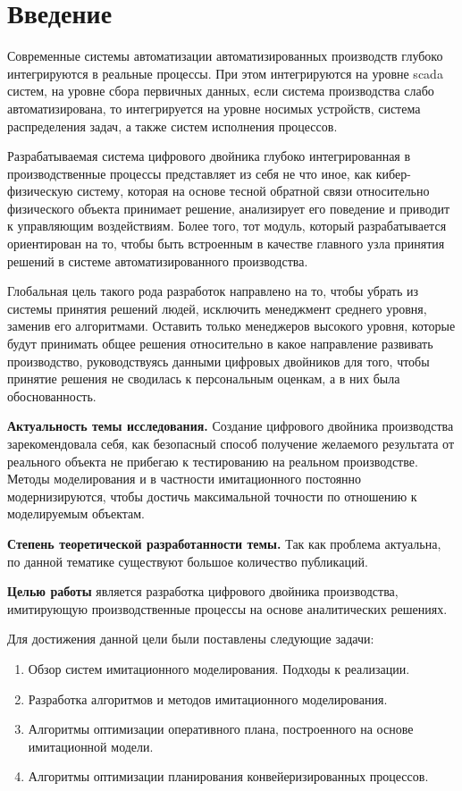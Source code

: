 \section*{Введение}
Современные системы  автоматизации автоматизированных производств глубоко интегрируются в реальные процессы.
При этом интегрируются на уровне scada систем, на уровне сбора первичных данных, если система производства слабо автоматизирована, то интегрируется на уровне носимых устройств, система распределения задач, а также систем исполнения процессов. 

Разрабатываемая система цифрового двойника глубоко интегрированная в производственные процессы представляет из себя не что иное, как кибер-физическую систему, которая на основе тесной обратной связи относительно физического объекта принимает решение, анализирует его поведение и приводит к управляющим воздействиям.
Более того, тот модуль, который разрабатывается ориентирован на то, чтобы быть встроенным в качестве главного узла принятия решений в системе автоматизированного производства.

Глобальная цель такого рода разработок направлено на то, чтобы убрать из системы принятия решений людей, исключить менеджмент среднего уровня, заменив его алгоритмами. Оставить только менеджеров высокого уровня, которые будут принимать общее решения относительно в какое направление развивать производство, руководствуясь данными цифровых двойников для того, чтобы принятие решения не сводилась к персональным оценкам, а в них была обоснованность.
\newpage

\textbf{Актуальность темы исследования.} Создание цифрового двойника производства зарекомендовала себя, как безопасный способ получение желаемого результата от реального объекта не прибегаю к тестированию на реальном производстве. Методы моделирования и в частности имитационного постоянно модернизируются, чтобы достичь максимальной точности по отношению к моделируемым объектам.

\textbf{Степень теоретической разработанности темы.} Так как проблема актуальна, по данной тематике существуют большое количество публикаций.

\textbf{Целью работы} является разработка цифрового двойника производства, имитирующую производственные процессы на основе аналитических решениях.

Для достижения данной цели были поставлены следующие задачи:

\begin{enumerate}
    \item Обзор систем имитационного моделирования. Подходы к реализации.
    \item Разработка алгоритмов и методов имитационного моделирования.
    \item Алгоритмы оптимизации оперативного плана, построенного на основе имитационной модели.
    \item Алгоритмы оптимизации планирования конвейеризированных процессов.
\end{enumerate}







